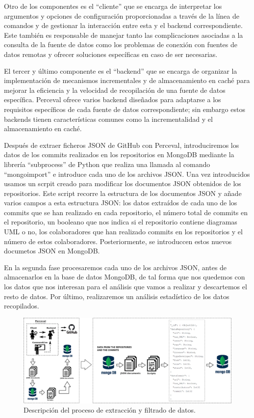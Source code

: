 \documentclass[a4paper, 12pt]{book}
\begin{document}
Otro de los componentes es el ``cliente'' que se encarga de interpretar los argumentos y opciones de configuración proporcionadas a través de la línea de comandos y de gestionar la interacción entre esta y el backend correspondiente.
Este también es responsable de manejar tanto las complicaciones asociadas a la consulta de la fuente de datos como los problemas de conexión con fuentes de datos remotas y ofrecer soluciones específicas en caso de ser necesarias.
 

El tercer y último componente es el ``backend'' que se encarga de organizar la implementación de mecanismos incrementales y de almacenamiento en caché para mejorar la eficiencia y la velocidad de recopilación de una fuente de datos específica.
Perceval ofrece varios backend diseñados para adaptarse a los requisitos específicos de cada fuente de datos correspondiente; sin embargo estos backends tienen características comunes como la incrementalidad y el almacenamiento en caché.


Después de extraer ficheros JSON de GitHub con Perceval, introduciremos los datos de los commits realizados en los repositorios en MongoDB mediante la librería ``subprocess'' de Python que realiza una llamada al comando ``mongoimport'' e introduce cada uno de los archivos JSON.
Una vez introducidos usamos un scrpit creado para modificar los documentos JSON obtenidos de los repositorios.
Este script recorre la estructura de los documentos JSON y añade varios campos a esta estructura JSON: los datos extraídos de cada uno de los commits que se han realizado en cada repositorio, el número total de commits en el repositorio, un booleano que nos indica si el repositorio contiene diagramas UML o no, los colaboradores que han realizado commits en los repositorios y el número de estos colaboradores.
Posteriormente, se introduccen estos nuevos documetos JSON en MongoDB.


En la segunda fase procesaremos cada uno de los archivos JSON, antes de almacenarlos en la base de datos MongoDB, de tal forma que nos quedemos con los datos que nos interesan para el análisis que vamos a realizar y descartemos el resto de datos.
Por último, realizaremos un análisis estadístico de los datos recopilados. 

\begin{figure}
  \centering
  \includegraphics[width=17cm, keepaspectratio]{img/Arquitectura_general.png}
  \caption{Descripción del proceso de extracción y filtrado de datos.}\label{fig:arquitectura}
\end{figure}
\end{document}
